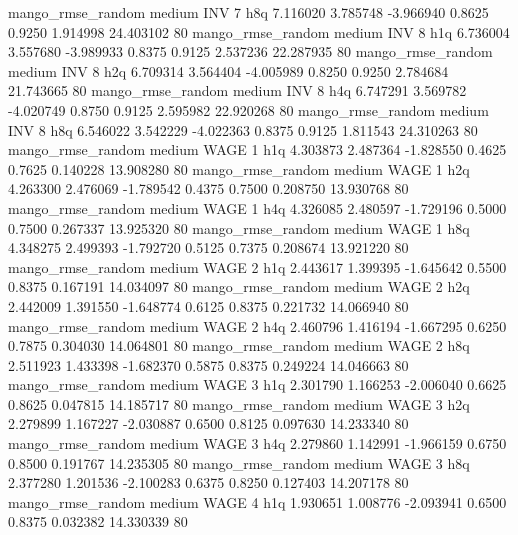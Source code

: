 mango_rmse_random     medium      INV                 7                  h8q  7.116020 3.785748 -3.966940 0.8625 0.9250  1.914998   24.403102 80
mango_rmse_random     medium      INV                 8                  h1q  6.736004 3.557680 -3.989933 0.8375 0.9125  2.537236   22.287935 80
mango_rmse_random     medium      INV                 8                  h2q  6.709314 3.564404 -4.005989 0.8250 0.9250  2.784684   21.743665 80
mango_rmse_random     medium      INV                 8                  h4q  6.747291 3.569782 -4.020749 0.8750 0.9125  2.595982   22.920268 80
mango_rmse_random     medium      INV                 8                  h8q  6.546022 3.542229 -4.022363 0.8375 0.9125  1.811543   24.310263 80
mango_rmse_random     medium     WAGE                 1                  h1q  4.303873 2.487364 -1.828550 0.4625 0.7625  0.140228   13.908280 80
mango_rmse_random     medium     WAGE                 1                  h2q  4.263300 2.476069 -1.789542 0.4375 0.7500  0.208750   13.930768 80
mango_rmse_random     medium     WAGE                 1                  h4q  4.326085 2.480597 -1.729196 0.5000 0.7500  0.267337   13.925320 80
mango_rmse_random     medium     WAGE                 1                  h8q  4.348275 2.499393 -1.792720 0.5125 0.7375  0.208674   13.921220 80
mango_rmse_random     medium     WAGE                 2                  h1q  2.443617 1.399395 -1.645642 0.5500 0.8375  0.167191   14.034097 80
mango_rmse_random     medium     WAGE                 2                  h2q  2.442009 1.391550 -1.648774 0.6125 0.8375  0.221732   14.066940 80
mango_rmse_random     medium     WAGE                 2                  h4q  2.460796 1.416194 -1.667295 0.6250 0.7875  0.304030   14.064801 80
mango_rmse_random     medium     WAGE                 2                  h8q  2.511923 1.433398 -1.682370 0.5875 0.8375  0.249224   14.046663 80
mango_rmse_random     medium     WAGE                 3                  h1q  2.301790 1.166253 -2.006040 0.6625 0.8625  0.047815   14.185717 80
mango_rmse_random     medium     WAGE                 3                  h2q  2.279899 1.167227 -2.030887 0.6500 0.8125  0.097630   14.233340 80
mango_rmse_random     medium     WAGE                 3                  h4q  2.279860 1.142991 -1.966159 0.6750 0.8500  0.191767   14.235305 80
mango_rmse_random     medium     WAGE                 3                  h8q  2.377280 1.201536 -2.100283 0.6375 0.8250  0.127403   14.207178 80
mango_rmse_random     medium     WAGE                 4                  h1q  1.930651 1.008776 -2.093941 0.6500 0.8375  0.032382   14.330339 80
